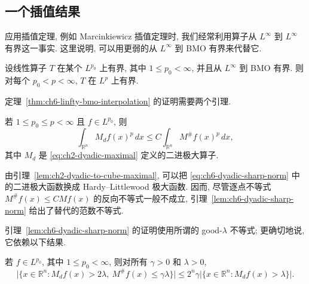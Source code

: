 \hypertarget{chapter-06-page-133}{}
\subsection{一个插值结果}
\label{sec:ch6-interpolation}

应用插值定理, 例如 Marcinkiewicz 插值定理时, 我们经常利用算子从 $L^\infty$ 到 $L^\infty$ 有界这一事实. 这里说明, 可以用更弱的从 $L^\infty$ 到 BMO 有界来代替它.

\begin{Theorem}
\label{thm:ch6-linfty-bmo-interpolation}
设线性算子 $T$ 在某个 $L^{p_0}$ 上有界, 其中 $1\le p_0<\infty$, 并且从 $L^\infty$ 到 BMO 有界. 则对每个 $p_0<p<\infty$, $T$ 在 $L^p$ 上有界.
\end{Theorem}

定理~\ref{thm:ch6-linfty-bmo-interpolation} 的证明需要两个引理.

\begin{Lemma}
\label{lem:ch6-dyadic-sharp-norm}
若 $1\le p_0\le p<\infty$ 且 $f\in L^{p_0}$, 则
\begin{equation}
\label{eq:ch6-dyadic-sharp-norm}
 \int_{\mathbb R^n}M_df(x)^p\,dx
 \le C\int_{\mathbb R^n}M^\#f(x)^p\,dx,
\end{equation}
其中 $M_d$ 是 \eqref{eq:ch2-dyadic-maximal} 定义的二进极大算子.
\end{Lemma}

由引理~\ref{lem:ch2-dyadic-to-cube-maximal}, 可以把 \eqref{eq:ch6-dyadic-sharp-norm} 中的二进极大函数换成 Hardy--Littlewood 极大函数. 因而, 尽管逐点不等式 $M^\#f(x)\le CMf(x)$ 的反向不等式一般不成立, 引理~\ref{lem:ch6-dyadic-sharp-norm} 给出了替代的范数不等式.

引理~\ref{lem:ch6-dyadic-sharp-norm} 的证明使用所谓的 good-$\lambda$ 不等式; 更确切地说, 它依赖以下结果.

\begin{Lemma}
\label{lem:ch6-good-lambda}
若 $f\in L^{p_0}$, 其中 $1\le p_0<\infty$, 则对所有 $\gamma>0$ 和 $\lambda>0$,
\[
 \bigl|\{x\in\mathbb R^n:M_df(x)>2\lambda,\ M^\#f(x)\le\gamma\lambda\}\bigr|
 \le2^n\gamma\bigl|\{x\in\mathbb R^n:M_df(x)>\lambda\}\bigr|.
\]
\end{Lemma}

